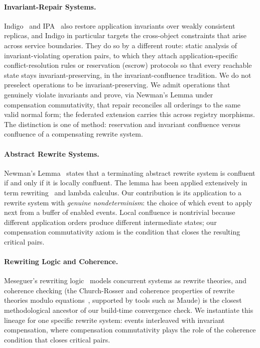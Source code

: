 \documentclass[11pt,a4paper]{article}
\theoremstyle{plain}
\theoremstyle{definition}
\theoremstyle{remark}
\renewcommand{\_}{\textunderscore\allowbreak}
\begin{document}
\paragraph{Invariant-Repair Systems.}
Indigo~\cite{balegas2015indigo} and IPA~\cite{balegas2019ipa} also restore
application invariants over weakly consistent replicas, and Indigo in particular
targets the cross-object constraints that arise across service boundaries.  They
do so by a different route: static analysis of invariant-violating operation
pairs, to which they attach application-specific conflict-resolution rules or
reservation (escrow) protocols so that every reachable state stays
invariant-preserving, in the invariant-confluence tradition.  We do not
preselect operations to be invariant-preserving.  We admit operations that
genuinely violate invariants and prove, via Newman's Lemma under compensation
commutativity, that repair reconciles all orderings to the same valid normal
form; the federated extension carries this across registry morphisms.  The
distinction is one of method: reservation and invariant confluence versus
confluence of a compensating rewrite system.

\paragraph{Abstract Rewrite Systems.}
Newman's Lemma~\cite{newman1942} states that a terminating abstract rewrite
system is confluent if and only if it is locally confluent.  The lemma has been
applied extensively in term rewriting~\cite{baader1998term} and lambda
calculus.  Our contribution is its application to a rewrite system with
\emph{genuine nondeterminism}: the choice of which event to apply next from a
buffer of enabled events.  Local confluence is nontrivial because different
application orders produce different intermediate states; our compensation
commutativity axiom is the condition that closes the resulting critical pairs.

\paragraph{Rewriting Logic and Coherence.}
Meseguer's rewriting logic~\cite{meseguer1992} models concurrent systems as
rewrite theories, and coherence checking (the Church-Rosser and coherence
properties of rewrite theories modulo equations~\cite{duran2012coherence},
supported by tools such as Maude) is the closest methodological ancestor of our
build-time convergence check.  We instantiate this lineage for one specific
rewrite system: events interleaved with invariant compensation, where
compensation commutativity plays the role of the coherence condition that closes
critical pairs.
\end{document}
